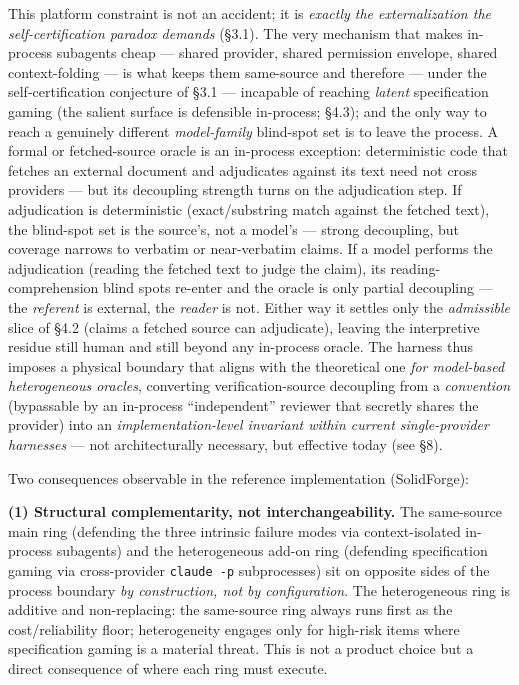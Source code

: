 \documentclass[
  11pt,
]{article}
\begin{document}
This platform constraint is not an accident; it is \emph{exactly the
externalization the self-certification paradox demands} (§3.1). The very
mechanism that makes in-process subagents cheap --- shared provider,
shared permission envelope, shared context-folding --- is what keeps
them same-source and therefore --- under the self-certification
conjecture of §3.1 --- incapable of reaching \emph{latent} specification
gaming (the salient surface is defensible in-process; §4.3); and the
only way to reach a genuinely different \emph{model-family} blind-spot
set is to leave the process. A formal or fetched-source oracle is an
in-process exception: deterministic code that fetches an external
document and adjudicates against its text need not cross providers ---
but its decoupling strength turns on the adjudication step. If
adjudication is deterministic (exact/substring match against the fetched
text), the blind-spot set is the source's, not a model's --- strong
decoupling, but coverage narrows to verbatim or near-verbatim claims. If
a model performs the adjudication (reading the fetched text to judge the
claim), its reading-comprehension blind spots re-enter and the oracle is
only partial decoupling --- the \emph{referent} is external, the
\emph{reader} is not. Either way it settles only the \emph{admissible}
slice of §4.2 (claims a fetched source can adjudicate), leaving the
interpretive residue still human and still beyond any in-process oracle.
The harness thus imposes a physical boundary that aligns with the
theoretical one \emph{for model-based heterogeneous oracles}, converting
verification-source decoupling from a \emph{convention} (bypassable by
an in-process ``independent'' reviewer that secretly shares the
provider) into an \emph{implementation-level invariant within current
single-provider harnesses} --- not architecturally necessary, but
effective today (see §8).

Two consequences observable in the reference implementation
(SolidForge):

\textbf{(1) Structural complementarity, not interchangeability.} The
same-source main ring (defending the three intrinsic failure modes via
context-isolated in-process subagents) and the heterogeneous add-on ring
(defending specification gaming via cross-provider \texttt{claude\ -p}
subprocesses) sit on opposite sides of the process boundary \emph{by
construction, not by configuration}. The heterogeneous ring is additive
and non-replacing: the same-source ring always runs first as the
cost/reliability floor; heterogeneity engages only for high-risk items
where specification gaming is a material threat. This is not a product
choice but a direct consequence of where each ring must execute.
\end{document}
